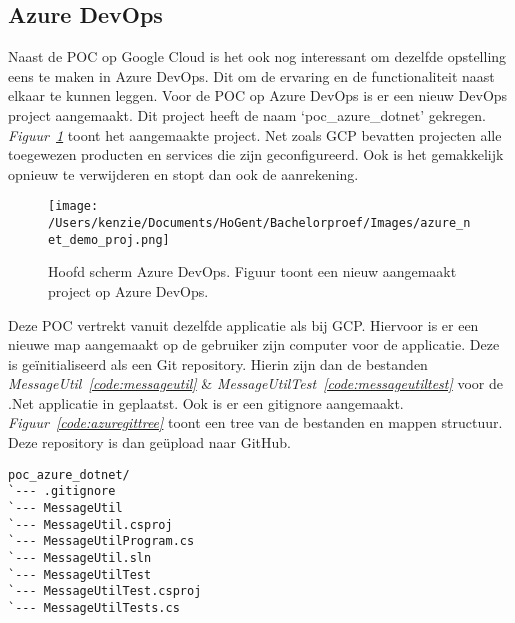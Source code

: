 \subsection{Azure DevOps}
\label{sec:VergelijkingADV}
Naast de POC op Google Cloud is het ook nog interessant om dezelfde opstelling eens te maken in Azure DevOps. Dit om de ervaring en de functionaliteit naast elkaar te kunnen leggen. Voor de POC op Azure DevOps is er een nieuw DevOps project aangemaakt. Dit project heeft de naam ‘poc\_azure\_dotnet’ gekregen. \emph{Figuur~\ref{fig:Azure_POC_proj}} toont het aangemaakte project. Net zoals GCP bevatten projecten alle toegewezen producten en services die zijn geconfigureerd. Ook is het gemakkelijk opnieuw te verwijderen en stopt dan ook de aanrekening.

\begin{figure}[!htbp]
    \centering
    \texttt{[image: /Users/kenzie/Documents/HoGent/Bachelorproef/Images/azure\_net\_demo\_proj.png]}
    \caption{Hoofd scherm Azure DevOps. Figuur toont een nieuw aangemaakt project op Azure DevOps.}
    \label{fig:Azure_POC_proj}
\end{figure}

Deze POC vertrekt vanuit dezelfde applicatie als bij GCP. Hiervoor is er een nieuwe map aangemaakt op de gebruiker zijn computer voor de applicatie. Deze is geïnitialiseerd als een Git repository. Hierin zijn dan de bestanden \emph{MessageUtil~\ref{code:messageutil}} \& \emph{MessageUtilTest~\ref{code:messageutiltest}} voor de .Net applicatie in geplaatst. Ook is er een gitignore aangemaakt. \emph{Figuur~\ref{code:azuregittree}} toont een tree van de bestanden en mappen structuur. Deze repository is dan geüpload naar GitHub.

\begin{lstlisting}
poc_azure_dotnet/
`--- .gitignore
`--- MessageUtil
`--- MessageUtil.csproj
`--- MessageUtilProgram.cs
`--- MessageUtil.sln
`--- MessageUtilTest
`--- MessageUtilTest.csproj
`--- MessageUtilTests.cs
\end{lstlisting}

